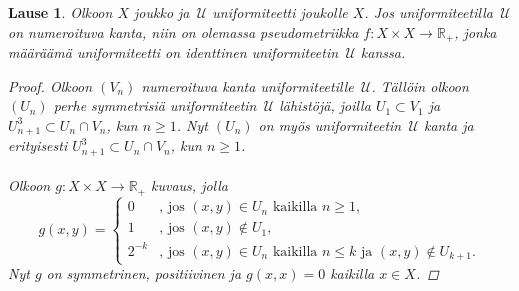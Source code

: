 \documentclass[12pt,a4paper,leqno]{report}
\newcommand{\R}{\mathbb{R}}
\newcommand{\U}{\,\mathcal{U}}
\theoremstyle{plain}
\newtheorem{lause}[equation]{Lause}
\theoremstyle{definition}
\theoremstyle{remark}
\begin{document}
\begin{lause}
Olkoon $X$ joukko ja $\U$ uniformiteetti joukolle $X$. 
Jos uniformiteetilla $\U$ on numeroituva kanta, 
niin on olemassa pseudometriikka $f\colon X\times X\rightarrow \R_+$, 
jonka määräämä uniformiteetti on identtinen uniformiteetin $\U$ kanssa.
\begin{proof}
Olkoon $(V_n)$ numeroituva kanta uniformiteetille $\U$. 
Tällöin olkoon $(U_n)$ perhe symmetrisiä uniformiteetin $\U$ lähistöjä, 
joilla $U_1\subset V_1$ ja $U_{n+1}^3\subset U_n\cap V_n$, kun $n\geq 1$. 
Nyt $(U_n)$ on myös uniformiteetin $\U$ kanta ja erityisesti 
$U_{n+1}^3\subset U_n\cap V_n$, kun $n\geq 1$. \\
\\
Olkoon $g\colon X\times X\rightarrow \R_+$ kuvaus, jolla 
\begin{equation*}
g(x,y)=
\begin{cases}
0&\text{, jos }(x,y)\in U_n\text{ kaikilla }n\geq 1, \\
1&\text{, jos }(x,y)\not\in U_1, \\
2^{-k}&\text{, jos }(x,y)\in U_n\text{ kaikilla }n\leq k 
\text{ ja } (x,y)\not\in U_{k+1}.
\end{cases}
\end{equation*}
Nyt $g$ on symmetrinen, positiivinen ja $g(x,x)=0$ kaikilla $x\in X$. 


\end{proof}
\end{lause}
\end{document}
